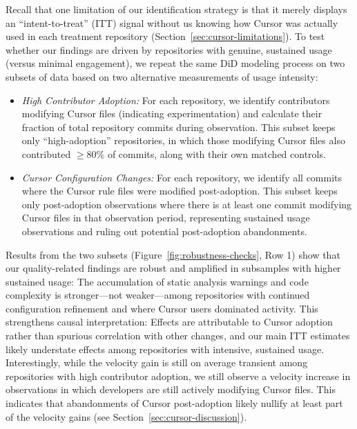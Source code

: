 Recall that one limitation of our identification strategy is that it merely displays an ``intent-to-treat'' (ITT) signal without us knowing how Cursor was actually used in each treatment repository (Section~\ref{sec:cursor-limitations}).
To test whether our findings are driven by repositories with genuine, sustained usage (versus minimal engagement), we repeat the same DiD modeling process on two subsets of data based on two alternative measurements of usage intensity:
\begin{itemize}[leftmargin=15pt]
    \item \emph{High Contributor Adoption:} For each repository, we identify contributors modifying Cursor files (indicating experimentation) and calculate their fraction of total repository commits during observation. 
    This subset keeps only ``high-adoption'' repositories, in which those modifying Cursor files also contributed $\geq$80\% of commits, along with their own matched controls.
    \item \emph{Cursor Configuration Changes:} For each repository, we identify all commits where the Cursor rule files were modified post-adoption. 
    This subset keeps only post-adoption observations where there is at least one commit modifying Cursor files in that observation period, representing sustained usage observations and ruling out potential post-adoption abandonments.
\end{itemize}
Results from the two subsets (Figure~\ref{fig:robustness-checks}, Row 1) show that our quality-related findings are robust and amplified in subsamples with higher sustained usage: The accumulation of static analysis warnings and code complexity is stronger---not weaker---among repositories with continued configuration refinement and where Cursor users dominated activity. 
This strengthens causal interpretation: Effects are attributable to Cursor adoption rather than spurious correlation with other changes, and our main ITT estimates likely understate effects among repositories with intensive, sustained usage.
Interestingly, while the velocity gain is still on average transient among repositories with high contributor adoption, we still observe a velocity increase in observations in which developers are still actively modifying Cursor files.
This indicates that abandonments of Cursor post-adoption likely nullify at least part of the velocity gains (see Section~\ref{sec:cursor-discussion}).

